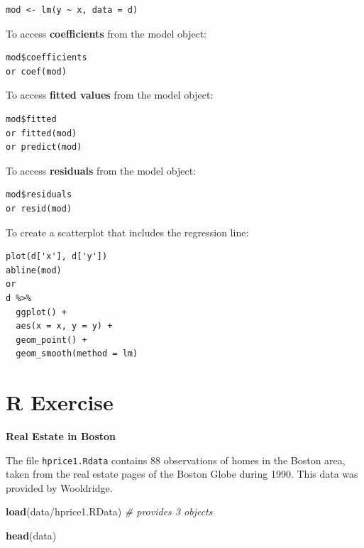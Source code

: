 \documentclass[
]{book}
\newenvironment{Shaded}{\begin{snugshade}}{\end{snugshade}}
\newcommand{\CommentTok}[1]{\textcolor[rgb]{0.56,0.35,0.01}{\textit{#1}}}
\newcommand{\FunctionTok}[1]{\textcolor[rgb]{0.13,0.29,0.53}{\textbf{#1}}}
\newcommand{\NormalTok}[1]{#1}
\newcommand{\StringTok}[1]{\textcolor[rgb]{0.31,0.60,0.02}{#1}}
\theoremstyle{definition}
\theoremstyle{definition}
\theoremstyle{definition}
\theoremstyle{definition}
\theoremstyle{remark}
\begin{document}
\begin{verbatim}
mod <- lm(y ~ x, data = d)
\end{verbatim}

To access \textbf{coefficients} from the model object:

\begin{verbatim}
mod$coefficients
or coef(mod)
\end{verbatim}

To access \textbf{fitted values} from the model object:

\begin{verbatim}
mod$fitted
or fitted(mod)
or predict(mod)
\end{verbatim}

To access \textbf{residuals} from the model object:

\begin{verbatim}
mod$residuals
or resid(mod)
\end{verbatim}

To create a scatterplot that includes the regression line:

\begin{verbatim}
plot(d['x'], d['y'])
abline(mod)
or 
d %>% 
  ggplot() + 
  aes(x = x, y = y) + 
  geom_point() + 
  geom_smooth(method = lm)
\end{verbatim}

\hypertarget{r-exercise}{%
\section{R Exercise}\label{r-exercise}}

\textbf{Real Estate in Boston}

The file \texttt{hprice1.Rdata} contains 88 observations of homes in the Boston area, taken from the real estate pages of the Boston Globe during 1990. This data was provided by Wooldridge.

\begin{Shaded}
\begin{Highlighting}[]
\FunctionTok{load}\NormalTok{(}\StringTok{\textquotesingle{}data/hprice1.RData\textquotesingle{}}\NormalTok{) }\CommentTok{\# provides 3 objects }
\end{Highlighting}
\end{Shaded}

\begin{Shaded}
\begin{Highlighting}[]
\FunctionTok{head}\NormalTok{(data)}
\end{Highlighting}
\end{Shaded}
\end{document}
